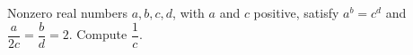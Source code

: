 Nonzero real numbers $a,b,c,d$, with $a$ and $c$ positive, satisfy $a^b=c^d$ and $\dfrac{a}{2c}=\dfrac bd=2$. Compute $\dfrac1c$.
